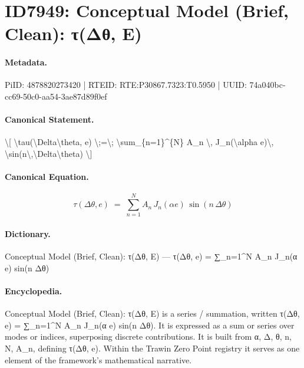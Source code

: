 \section*{ID7949: Conceptual Model (Brief, Clean): τ(Δθ, E)}
\paragraph{Metadata.}
PiID: 4878820273420 | RTEID: RTE:P30867.7323:T0.5950 | UUID: 74a040bc-cc69-50c0-aa54-3ae87d89f0ef

\paragraph{Canonical Statement.}
\textbackslash{}[ \textbackslash{}tau(\textbackslash{}Delta\textbackslash{}theta, e) \textbackslash{};=\textbackslash{}; \textbackslash{}sum\_\{n=1\}\textasciicircum{}\{N\} A\_n \textbackslash{}, J\_n(\textbackslash{}alpha e)\textbackslash{}, \textbackslash{}sin(n\textbackslash{},\textbackslash{}Delta\textbackslash{}theta) \textbackslash{}]

\paragraph{Canonical Equation.}
\[
\tau(\Delta\theta, e) \;=\; \sum_{n=1}^{N} A_n \, J_n(\alpha e)\, \sin(n\,\Delta\theta)
\]

\paragraph{Dictionary.}
Conceptual Model (Brief, Clean): τ(Δθ, E) — τ(Δθ, e) = ∑\_n=1\textasciicircum{}N A\_n J\_n(α e) sin(n Δθ)

\paragraph{Encyclopedia.}
Conceptual Model (Brief, Clean): τ(Δθ, E) is a series / summation, written τ(Δθ, e) = ∑\_n=1\textasciicircum{}N A\_n J\_n(α e) sin(n Δθ). It is expressed as a sum or series over modes or indices, superposing discrete contributions. It is built from α, Δ, θ, n, N, A\_n, defining τ(Δθ, e). Within the Trawin Zero Point registry it serves as one element of the framework's mathematical narrative.
